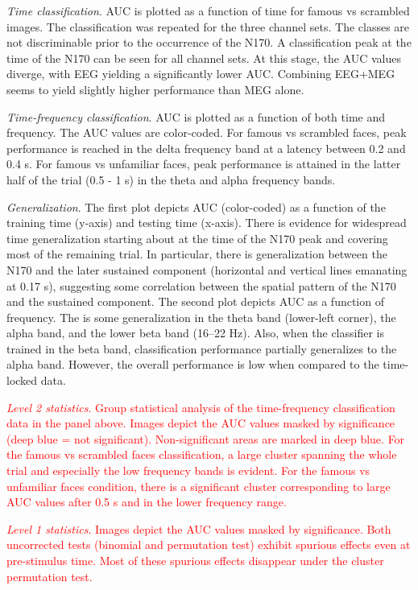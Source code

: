 \documentclass[utf8]{frontiersSCNS} %
\newcommand{\red}[1]{\textcolor{red}{#1}}
\begin{document}
\textit{Time classification}. AUC is plotted as a function of time for famous vs scrambled images. The classification was repeated for the three channel sets. The classes are not discriminable prior to the occurrence of the N170. A classification peak at the time of the N170 can be seen for all channel sets. At this stage, the AUC values diverge, with EEG yielding a significantly lower AUC. Combining EEG+MEG seems to yield slightly higher performance than MEG alone.

\textit{Time-frequency classification}. AUC is plotted as a function of both time and frequency. The AUC values are color-coded. For famous vs scrambled faces, peak performance is reached in the delta frequency band at a latency between 0.2 and 0.4 s. For famous vs unfamiliar faces, peak performance is attained in the latter half of the trial (0.5 - 1 s) in the theta and alpha frequency bands. 

\textit{Generalization}. The first plot depicts AUC (color-coded) as a function of the training time (y-axis) and testing time (x-axis). There is evidence for widespread time generalization starting about at the time of the N170 peak and covering most of the remaining trial. In particular, there is generalization between the N170 and the later sustained component (horizontal and vertical lines emanating at 0.17 s), suggesting some correlation between the spatial pattern of the N170 and the sustained component. 
The second plot depicts AUC as a function of frequency. The is some generalization in the theta band (lower-left corner), the alpha band, and the lower beta band (16--22 Hz). Also, when the classifier is trained in the beta band, classification performance partially generalizes to the alpha band. However, the overall performance is low when compared to the time-locked data. 

\red{\textit{Level 2 statistics}. Group statistical analysis of the time-frequency classification data in the panel above. Images depict the AUC values masked by significance (deep blue = not significant). Non-significant areas are marked in deep blue. For the famous vs scrambled faces classification, a large cluster spanning the whole trial and especially the low frequency bands is evident. For the famous vs unfamiliar faces condition, there is a significant  cluster corresponding to large AUC values after 0.5 s and in the lower frequency range.}

\red{\textit{Level 1 statistics}. Images depict the AUC values masked by significance. Both uncorrected tests (binomial and permutation test) exhibit spurious effects even at pre-stimulus time. Most of these spurious effects disappear under the cluster permutation test.}
\end{document}

